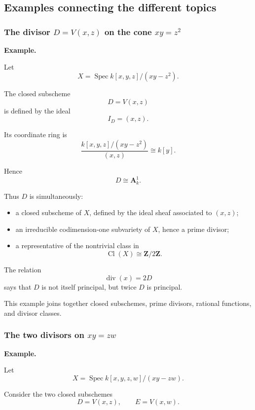 \documentclass[12pt,a4paper]{article}
\theoremstyle{notespace}
\begin{document}
\subsection{Examples connecting the different topics}

\subsubsection{\texorpdfstring{The divisor \(D=V(x,z)\) on the cone \(xy=z^2\)}{A divisor on the quadric cone}}

\textbf{Example.}

Let
\[
X=\operatorname{Spec}k[x,y,z]/(xy-z^2).
\]

The closed subscheme
\[
D=V(x,z)
\]
is defined by the ideal
\[
I_D=(x,z).
\]

Its coordinate ring is
\[
\frac{k[x,y,z]/(xy-z^2)}{(x,z)}
\cong
k[y].
\]

Hence
\[
D\cong\mathbf A^1_k.
\]

Thus \(D\) is simultaneously:

\begin{itemize}
	\item a closed subscheme of \(X\), defined by the ideal sheaf associated to \((x,z)\);
	\item an irreducible codimension-one subvariety of \(X\), hence a prime divisor;
	\item a representative of the nontrivial class in
	\[
	\operatorname{Cl}(X)\cong\mathbf Z/2\mathbf Z.
	\]
\end{itemize}

The relation
\[
\operatorname{div}(x)=2D
\]
says that \(D\) is not itself principal, but twice \(D\) is principal.

This example joins together closed subschemes, prime divisors, rational functions, and divisor classes.

\subsubsection{\texorpdfstring{The two divisors on \(xy=zw\)}{Two divisors on the three-dimensional cone}}

\textbf{Example.}

Let
\[
X=\operatorname{Spec}k[x,y,z,w]/(xy-zw).
\]

Consider the two closed subschemes
\[
D=V(x,z),
\qquad
E=V(x,w).
\]
\end{document}
